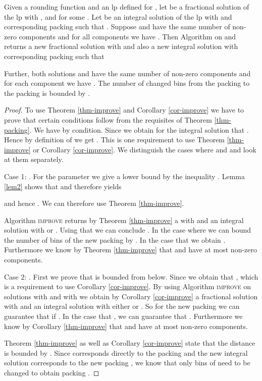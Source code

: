 \begin{theorem}\label{thm-packing}
    Given a rounding function  and an \ac{lp} defined for , let  be a fractional solution of the \ac{lp} with
	,  and  for some . Let  be an integral solution of the \ac{lp} with  and corresponding packing  such that .
	Suppose  and  have the same number  of non-zero components and for all components  we have
	.	Then Algorithm  on  and  returns a new fractional solution  with  and also a new integral solution  with corresponding packing  such that
	
	Further, both solutions  and  have the same number  of non-zero components and for each component we have
	. The number of changed bins from the packing
         to the packing  is bounded by .
    \end{theorem}
\begin{proof}
	

    To use Theorem \ref{thm-improve} and Corollary \ref{cor-improve} we have to prove that certain conditions follow from the requisites of Theorem \ref{thm-packing}.
    We have  by condition. Since
	 we obtain for the integral solution  that
	.
	Hence by definition of  we get . This is one requirement to use Theorem \ref{thm-improve}
	or Corollary \ref{cor-improve}.
	We distinguish the cases where   and  and look at them separately.
	
	Case 1: .
    For the parameter  we give a lower bound by the inequality . Lemma \ref{lem2} shows that  and therefore yields  
    
    and hence . We can therefore use Theorem \ref{thm-improve}.
    
	Algorithm \textsc{improve} returns by Theorem \ref{thm-improve} a  with  and an integral solution  with	 or . Using that  we can conclude . In the case where  we can bound the number of bins of the new packing  by	.
	In the case that  we obtain . Furthermore we know by Theorem \ref{thm-improve} that  and  have at most  non-zero components.
	
	Case 2: .
    First we prove that  is bounded from below. Since  we obtain that , which is a requirement to use Corollary \ref{cor-improve}.
	By using Algorithm \textsc{improve} on solutions  with  and  with  we obtain by Corollary \ref{cor-improve} a fractional solution  with
	 and an integral solution  with either  or .
	So for the new packing  we can guarantee that  if . In the case that , we can guarantee that . Furthermore we know by Corollary \ref{thm-improve} that  and  have at most  non-zero components.
    
Theorem \ref{thm-improve} as well as Corollary \ref{cor-improve} state that the distance  is bounded by . Since  corresponds directly to the packing  and the new integral solution  corresponds to the new packing , we know that only  bins of  need to be changed to obtain packing .
\end{proof}

